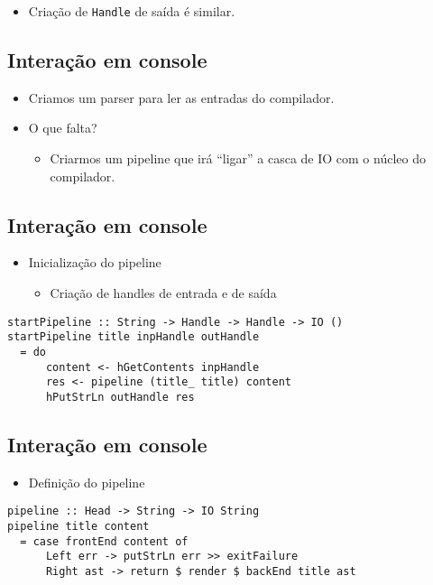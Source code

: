 \documentclass[11pt]{article}
\begin{document}
\begin{itemize}
\item Criação de \texttt{Handle} de saída é similar.
\end{itemize}
\subsection*{Interação em console}
\label{sec:orgd2b240b}

\begin{itemize}
\item Criamos um parser para ler as entradas do compilador.

\item O que falta?
\begin{itemize}
\item Criarmos um pipeline que irá ``ligar'' a casca de IO com o núcleo do compilador.
\end{itemize}
\end{itemize}
\subsection*{Interação em console}
\label{sec:org6a4f19b}

\begin{itemize}
\item Inicialização do pipeline
\begin{itemize}
\item Criação de handles de entrada e de saída
\end{itemize}
\end{itemize}

\begin{verbatim}
startPipeline :: String -> Handle -> Handle -> IO ()
startPipeline title inpHandle outHandle
  = do
      content <- hGetContents inpHandle
      res <- pipeline (title_ title) content
      hPutStrLn outHandle res
\end{verbatim}
\subsection*{Interação em console}
\label{sec:orga9ccd39}

\begin{itemize}
\item Definição do pipeline
\end{itemize}

\begin{verbatim}
pipeline :: Head -> String -> IO String
pipeline title content
  = case frontEnd content of
      Left err -> putStrLn err >> exitFailure
      Right ast -> return $ render $ backEnd title ast
\end{verbatim}
\end{document}
